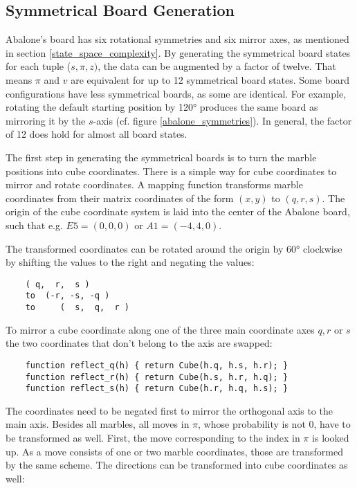 \subsection{Symmetrical Board Generation}
Abalone's board has six rotational symmetries and six mirror axes, as mentioned in section \ref{state_space_complexity}. By generating the symmetrical board states for each tuple ($s, \pi, z)$, the data can be augmented by a factor of twelve. That means $\pi$ and $v$ are equivalent for up to 12 symmetrical board states. Some board configurations have less symmetrical boards, as some are identical. For example, rotating the default starting position by 120° produces the same board as mirroring it by the $s$-axis (cf. figure \ref{abalone_symmetries}). In general, the factor of 12 does hold for almost all board states.

The first step in generating the symmetrical boards is to turn the marble positions into cube coordinates. There is a simple way for cube coordinates to mirror and rotate coordinates. A mapping function transforms marble coordinates from their matrix coordinates of the form $(x, y)$ to $(q, r, s)$. The origin of the cube coordinate system is laid into the center of the Abalone board, such that e.g. $E5 = (0, 0, 0)$ or $A1 = (-4, 4, 0)$.

The transformed coordinates can be rotated around the origin by 60° clockwise by shifting the values to the right and negating the values:

\begin{BVerbatim}
    ( q,  r,  s )
    to  (-r, -s, -q )
    to     (  s,  q,  r )
\end{BVerbatim}

To mirror a cube coordinate along one of the three main coordinate axes $q, r$ or $s$ the two coordinates that don't belong to the axis are swapped:

\begin{BVerbatim}
    function reflect_q(h) { return Cube(h.q, h.s, h.r); }
    function reflect_r(h) { return Cube(h.s, h.r, h.q); }
    function reflect_s(h) { return Cube(h.r, h.q, h.s); }
\end{BVerbatim}

The coordinates need to be negated first to mirror the orthogonal axis to the main axis. Besides all marbles, all moves in $\pi$, whose probability is not $0$, have to be transformed as well. First, the move corresponding to the index in $\pi$ is looked up. As a move consists of one or two marble coordinates, those are transformed by the same scheme. The directions can be transformed into cube coordinates as well:

